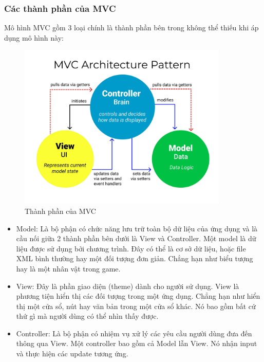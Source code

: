 \subsubsection{Các thành phần của MVC}
Mô hình MVC gồm 3 loại chính là thành phần bên trong không thể thiếu khi áp dụng mô hình này:
\begin{figure}[H]
    \centering
    \includegraphics[width=10cm]{Images/cacthanhphanmvc.png}
    \vspace{0.5cm}
    \caption{Thành phần của MVC}
    \label{fig:my_label}
\end{figure}

\begin{itemize}
    \item Model: Là bộ phận có chức năng lưu trữ toàn bộ dữ liệu của ứng dụng và là cầu nối giữa 2 thành phần bên dưới là View và Controller. Một model là dữ liệu được sử dụng bởi chương trình. Đây có thể là cơ sở dữ liệu, hoặc file XML bình thường hay một đối tượng đơn giản. Chẳng hạn như biểu tượng hay là một nhân vật trong game.
    \item View: Đây là phần giao diện (theme) dành cho người sử dụng. View là phương tiện hiển thị các đối tượng trong một ứng dụng. Chẳng hạn như hiển thị một cửa sổ, nút hay văn bản trong một cửa sổ khác. Nó bao gồm bất cứ thứ gì mà người dùng có thể nhìn thấy được.
    \item Controller: Là bộ phận có nhiệm vụ xử lý các yêu cầu người dùng đưa đến thông qua View. Một controller bao gồm cả Model lẫn View. Nó nhận input và thực hiện các update tương ứng.
\end{itemize}

